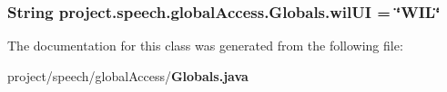 \subsubsection[{wil\+U\+I}]{\setlength{\rightskip}{0pt plus 5cm}String project.\+speech.\+global\+Access.\+Globals.\+wil\+U\+I = \char`\"{}W\+I\+L\char`\"{}\hspace{0.3cm}{\ttfamily [static]}}\label{classproject_1_1speech_1_1global_access_1_1_globals_a83a9282946ce69a77e0d4d36d924ea7a}


The documentation for this class was generated from the following file\+:\begin{DoxyCompactItemize}
\item 
project/speech/global\+Access/{\bf Globals.\+java}\end{DoxyCompactItemize}
